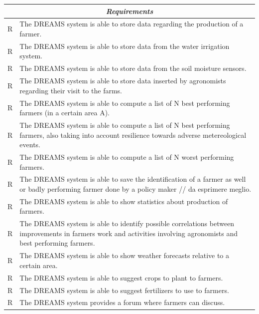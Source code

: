 \documentclass{article}
\begin{document}
\begin{longtable}[c]{|m{0.75cm}|m{11cm}|}
 \hline
 \multicolumn{2}{|c|}{\cellcolor{white}\textbf{\emph{Requirements}}}
 \endfirsthead
 \endhead
 \endfoot
 \endlastfoot
  \hline
  R & The DREAMS system is able to store data regarding users.\\
  \hline
  R & The DREAMS system is able to store data regarding the production of a farmer.\\
  \hline
  R & The DREAMS system is able to store data from the water irrigation system.\\
  \hline
  R & The DREAMS system is able to store data from the soil moisture sensors.\\
  \hline
  R & The DREAMS system is able to store data inserted by agronomists regarding their visit to the farms.\\
  \hline
  R & The DREAMS system is able to compute a list of N best performing farmers (in a certain area A).\\
  \hline
  R & The DREAMS system is able to compute a list of N best performing farmers, also taking into account resilience towards adverse metereological events.\\
  \hline
  R & The DREAMS system is able to compute a list of N worst performing farmers.\\
  \hline
  R & The DREAMS system is able to save the identification of a farmer as well or badly performing farmer done by a policy maker // da esprimere meglio.\\
  \hline
  R & The DREAMS system is able to show statistics about production of farmers.\\
  \hline
  R & The DREAMS system is able to identify possible correlations between improvements in farmers work and activities involving agronomists and best performing farmers.\\
  \hline
  R & The DREAMS system is able to show weather forecasts relative to a certain area.\\
  \hline
  R & The DREAMS system is able to suggest crops to plant to farmers.\\
  \hline
  R & The DREAMS system is able to suggest fertilizers to use to farmers.\\
  \hline
  R & The DREAMS system provides a forum where farmers can discuss.\\

\end{longtable}
\end{document}
